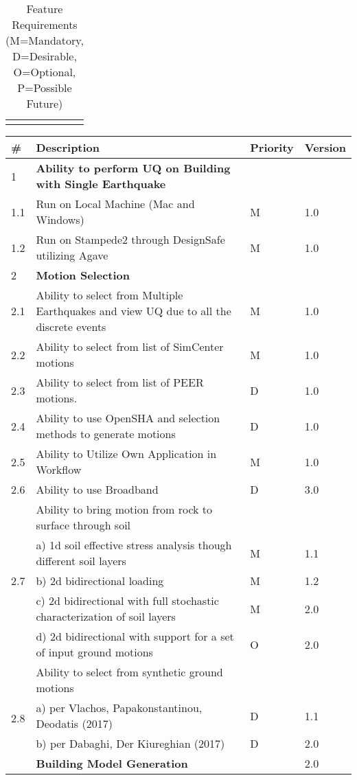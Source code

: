 {\begin{longtable}{| p{} | p{} | p{} | p{} |}
	\bottomrule 
\caption{Feature Requirements (M=Mandatory, D=Desirable, O=Optional, P=Possible Future)}             
  \label{tab:featureRequirements}                 
\end{longtable}
}{
\begin{longtable}{| p{} | p{} | p{} | p{} |}
    \toprule
      \# & Description & Priority & Version \\ \hline
      1 & \textbf{Ability to perform UQ on Building with Single Earthquake} &  &  \\ 
	1.1 & Run on Local Machine (Mac and Windows) & M & 1.0 \\ \hline
	1.2 & Run on Stampede2 through DesignSafe utilizing Agave & M & 1.0 \\ \hline
	2 & \textbf{Motion Selection} &  &  \\ \hline
	2.1 & Ability to select from Multiple Earthquakes and view UQ due to all the discrete events & M & 1.0  \\ \hline
	2.2 & Ability to select from list of SimCenter motions & M & 1.0 \\ \hline
	2.3 & Ability to select from list of PEER motions. & D & 1.0 \\ \hline
	2.4 & Ability to use OpenSHA and selection methods to generate motions & D & 1.0 \\ \hline
	2.5 & Ability to Utilize Own Application in Workflow & M & 1.0 \\ \hline
	2.6 & Ability to use Broadband & D & 3.0 \\ \hline
	\multirow{5}{*}{2.7} 
	& Ability to bring motion from rock to surface through soil &  &  \\ 
	 & a)     1d soil effective stress analysis though different soil layers & M & 1.1  \\ 
	 & b)     2d bidirectional loading & M & 1.2 \\ 
	 & c)     2d bidirectional with full stochastic characterization of soil layers & M & 2.0 \\
	 & d)     2d bidirectional with support for a set of input ground motions & O & 2.0 \\ 
	 \hline
	\multirow{5}{*}{2.8} 
	& Ability to select from synthetic ground motions &  &  \\
	 & a)     per Vlachos, Papakonstantinou, Deodatis (2017) & D & 1.1  \\ 
	 & b)     per Dabaghi, Der Kiureghian (2017) & D & 2.0 \\ \hline
	3 & \textbf{Building Model Generation} &  & 2.0 \\ \hline

\end{longtable}}
